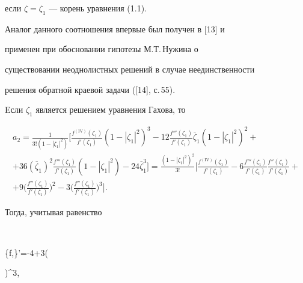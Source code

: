 если $\zeta=\zeta_1$ --- корень уравнения (1.1).





Аналог данного соотношения впервые был получен в [13] и


применен при обосновании гипотезы М.Т.\,Нужина о


существовании неоднолистных решений в случае неединственности


решения обратной краевой задачи ([14], с.\,55).








Eсли $\zeta_1$ является решением уравнения Гахова, то


\begin{gather*}


a_2=\frac


1{3!(1-|\zeta_1|^2)}\bigg[\frac{f^{(\mathrm{IV})}(\zeta_1)}{f'(\zeta_1)}


(1-|\zeta_1|^2)^3-12\frac{f'''(\zeta_1)}{f'(\zeta_1)}\overline


\zeta_1(1-|\zeta_1|^2)^2+ \\


%


+36(\overline\zeta_1)^2\frac{f'''(\zeta


_1)}{f'(\zeta_1)}(1-|\zeta_1|^2)-24\overline\zeta_1^3\bigg]=


\frac{(1-|\zeta_1|^2)^2}{3!}\bigg[\frac{f^{(\mathrm{IV})}(\zeta_1)}{f'(


\zeta_1)}-6\frac{f'''(\zeta_1)}{f'(\zeta_1)}\frac{f''(\zeta_1)}


{f'(\zeta_1)}+ \\


%


+9\bigg(\frac{f''(\zeta_1)}{f'(\zeta_1)}\bigg)^2-


3\bigg(\frac{f''(\zeta_1)}{f'(\zeta_1)}\bigg)^3\bigg].


\end{gather*}





Тогда, учитывая равенство


$$


\{f,\zeta\}'=-4+3\bigg(


\bigg)^3,


